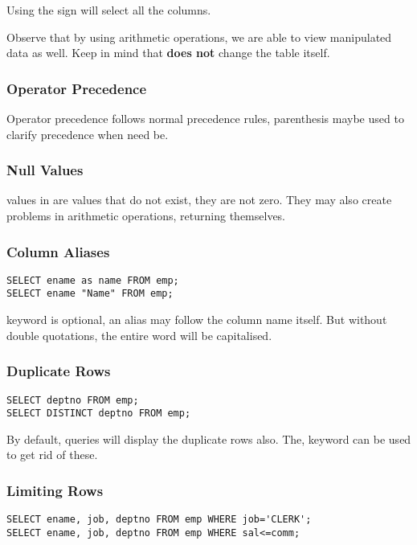 \documentclass[11pt,a4paper,twocolumn]{book}
\begin{document}
Using the \C{*} sign will select all the columns.

Observe that by using arithmetic operations, we are able to view manipulated data as well. Keep in mind that  \textbf{does not} change the table itself.

\subsubsection{Operator Precedence}

Operator precedence follows normal precedence rules, parenthesis maybe used to clarify precedence when need be.

\subsubsection{Null Values}

 values in are values that do not exist, they are not zero. They may also create problems in arithmetic operations, returning  themselves.

\subsubsection{Column Aliases}

\begin{lstlisting}
SELECT ename as name FROM emp;
SELECT ename "Name" FROM emp;
\end{lstlisting}

 keyword is optional, an alias may follow the column name itself. But without double quotations, the entire word will be capitalised.

\subsubsection{Duplicate Rows}


\begin{lstlisting}
SELECT deptno FROM emp;
SELECT DISTINCT deptno FROM emp;
\end{lstlisting}

By default, queries will display the duplicate rows also. The,  keyword can be used to get rid of these.

\subsubsection{Limiting Rows}

\begin{lstlisting}
SELECT ename, job, deptno FROM emp WHERE job='CLERK';
SELECT ename, job, deptno FROM emp WHERE sal<=comm;
\end{lstlisting}
\end{document}
